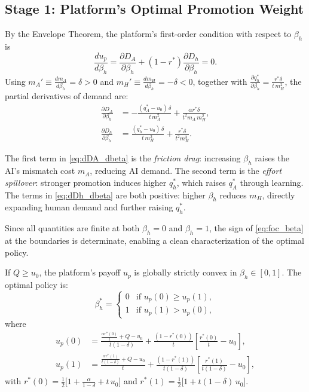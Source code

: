 \documentclass[mnsc,nonblindrev]{informs3_NoOR}
\begin{document}
\subsection{Stage 1: Platform's Optimal Promotion Weight}

By the Envelope Theorem, the platform's first-order condition with respect to $\beta_h$ is
\begin{equation}
    \frac{du_p}{d\beta_h} = \frac{\partial D_A}{\partial\beta_h} + (1-r^*)\frac{\partial D_h}{\partial\beta_h} = 0.
    \label{eq:foc_beta}
\end{equation}
Using $m_A' \equiv \tfrac{dm_A}{d\beta_h} = \delta > 0$ and $m_H' \equiv \tfrac{dm_H}{d\beta_h} = -\delta < 0$, together with $\tfrac{\partial q_h^*}{\partial\beta_h} = \tfrac{r^*\delta}{t\,m_H^2}$, the partial derivatives of demand are:
\begin{align}
    \frac{\partial D_A}{\partial\beta_h} &= 
        -\frac{(q_A^*-u_0)\,\delta}{t\,m_A^2} 
        + \frac{\alpha r^*\delta}{t^2 m_A\,m_H^2},
    \label{eq:dDA_dbeta}\\[4pt]
    \frac{\partial D_h}{\partial\beta_h} &= 
        \frac{(q_h^*-u_0)\,\delta}{t\,m_H^2} 
        + \frac{r^*\delta}{t^2 m_H^3}.
    \label{eq:dDh_dbeta}
\end{align}

The first term in \eqref{eq:dDA_dbeta} is the \emph{friction drag}: increasing $\beta_h$ raises the AI's mismatch cost $m_A$, reducing AI demand. The second term is the \emph{effort spillover}: stronger promotion induces higher $q_h^*$, which raises $q_A^*$ through learning. The terms in \eqref{eq:dDh_dbeta} are both positive: higher $\beta_h$ reduces $m_H$, directly expanding human demand and further raising $q_h^*$.

Since all quantities are finite at both $\beta_h = 0$ and $\beta_h = 1$, the sign of \eqref{eq:foc_beta} at the boundaries is determinate, enabling a clean characterization of the optimal policy.

\begin{proposition}
\label{prop:corner}
If $Q \ge u_0$, the platform's payoff $u_p$ is globally strictly convex in $\beta_h \in [0,1]$. The optimal policy is:
\begin{equation}
    \beta_h^* = \begin{cases} 0 & \text{if } u_p(0) \ge u_p(1), \\ 1 & \text{if } u_p(1) > u_p(0), \end{cases}
    \label{eq:corner}
\end{equation}
where
\begin{align}
    u_p(0) &= \frac{\frac{\alpha r^*(0)}{t}+Q - u_0}{t(1-\delta)} + \frac{(1-r^*(0))}{t}\left[\frac{r^*(0)}{t} - u_0\right], \label{eq:up0}\\[4pt]
    u_p(1) &= \frac{\tfrac{\alpha r^*(1)}{t(1-\delta)} + Q - u_0}{t} + \frac{(1-r^*(1))}{t(1-\delta)}\left[\frac{r^*(1)}{t(1-\delta)} - u_0\right], \label{eq:up1}
\end{align}
with $r^*(0) = \tfrac{1}{2}\bigl[1 + \tfrac{\alpha}{1-\delta} + t\,u_0\bigr]$ and $r^*(1) = \tfrac{1}{2}\bigl[1 + t(1-\delta)\,u_0\bigr]$.
\end{proposition}
\end{document}
